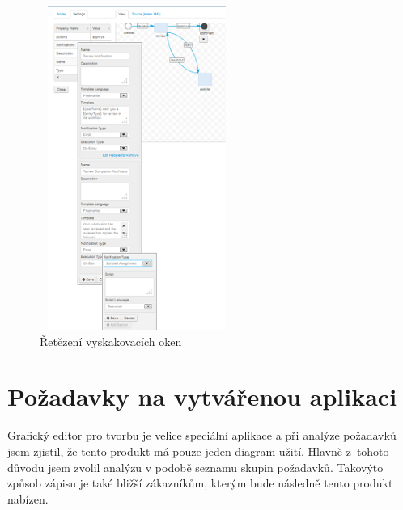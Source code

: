 \documentclass{fithesis}
\begin{document}
\begin{figure}[htp]
\centering
\includegraphics[width=240px, height=400px]{images/kaleo_designer_popup.png}
\caption{Řetězení vyskakovacích oken}
\label{fig:kaleo_designer_popup}
\end{figure}

\section{Požadavky na vytvářenou aplikaci}
Grafický editor pro tvorbu je velice speciální aplikace a při analýze požadavků jsem zjistil, že tento produkt má pouze jeden diagram užití. Hlavně z~tohoto důvodu jsem zvolil analýzu v podobě seznamu skupin požadavků. Takovýto způsob zápisu je také bližší zákazníkům, kterým bude následně tento produkt nabízen. 
\end{document}
